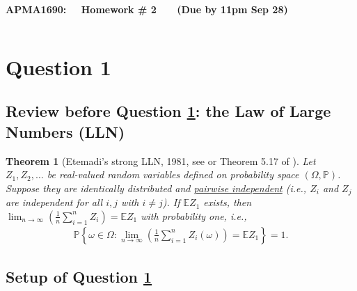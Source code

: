 \documentclass[11pt,letterpaper, leqno]{article}
\newtheorem{theorem}{Theorem}
\numberwithin{equation}{section}
\numberwithin{theorem}{section}
\numberwithin{lemma}{section}
\numberwithin{corollary}{section}
\numberwithin{definition}{section}
\numberwithin{proposition}{section}
\numberwithin{remark}{section}
\numberwithin{example}{section}
\begin{document}
\begin{center}
{\bf \Large APMA1690: ~~Homework \# 2 ~~~(Due by 11pm Sep 28)}
\end{center}
\[\]
\medskip

\section{Question 1}\label{Question 1}

\subsection{Review before Question \ref{Question 1}: the Law of Large Numbers (LLN)}

\begin{theorem}[Etemadi's strong LLN, 1981, see \cite{etemadi1981elementary} or Theorem 5.17 of \cite{klenke2013probability}]\label{thm: Etemadi's strong LLN}
Let $Z_1, Z_2, \ldots$ be real-valued random variables defined on probability space $(\Omega,\mathbb{P})$. Suppose they are identically distributed and \href{https://en.wikipedia.org/wiki/Pairwise_independence}{pairwise independent} (i.e., $Z_i$ and $Z_j$ are independent for all $i,j$ with $i\ne j$). If $\mathbb{E} Z_1$ exists, then $\lim_{n\rightarrow\infty}\left(\frac{1}{n}\sum_{i=1}^nZ_i\right)=\mathbb{E}Z_1$ with probability one, i.e.,
\begin{align}\label{eq: Etemadi's strong LLN}
    \mathbb{P}\left\{\omega\in\Omega: \lim_{n\rightarrow\infty}\left(\frac{1}{n}\sum_{i=1}^n Z_i(\omega)\right)=\mathbb{E}Z_1\right\}=1.
\end{align}
\end{theorem}


\subsection{Setup of Question \ref{Question 1}}
\end{document}
